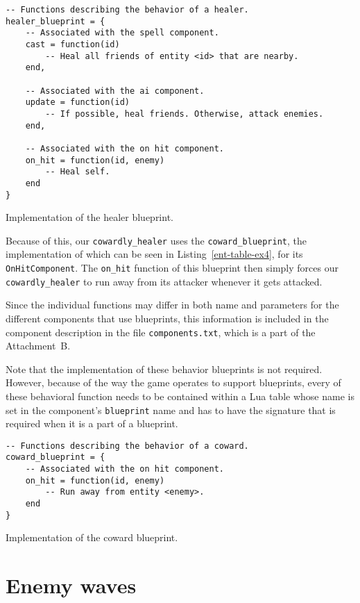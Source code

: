 \begin{listing}[H]
    \centering
    \begin{lstlisting}
-- Functions describing the behavior of a healer.
healer_blueprint = {
    -- Associated with the spell component.
    cast = function(id)
        -- Heal all friends of entity <id> that are nearby.
    end,

    -- Associated with the ai component.
    update = function(id)
        -- If possible, heal friends. Otherwise, attack enemies.
    end,

    -- Associated with the on hit component.
    on_hit = function(id, enemy)
        -- Heal self.
    end
}
    \end{lstlisting}
    \caption{Implementation of the healer blueprint.}
    \label{ent-table-ex3}
\end{listing}

Because of this, our \texttt{cowardly\_healer} uses the \texttt{coward\_blueprint}, the implementation of which can be seen in
Listing~\ref{ent-table-ex4}, for its \texttt{OnHitComponent}. The \texttt{on\_hit} function of this blueprint then simply forces our
\texttt{cowardly\_healer} to run away from its attacker whenever it gets attacked.

Since the individual functions may differ in both name and parameters for the different components that use blueprints, this information
is included in the component description in the file \texttt{components.txt}, which is a part of the Attachment~B.

Note that the implementation of these behavior blueprints is not required. However, because of the way the game operates to support
blueprints, every of these behavioral function needs to be contained within a Lua table whose name is set in the component's
\texttt{blueprint} name and has to have the signature that is required when it is a part of a blueprint.

\begin{listing}[H]
    \centering
    \begin{lstlisting}
-- Functions describing the behavior of a coward.
coward_blueprint = {
    -- Associated with the on hit component.
    on_hit = function(id, enemy)
        -- Run away from entity <enemy>.
    end
}
    \end{lstlisting}
    \caption{Implementation of the coward blueprint.}
    \label{ent-table-ex4}
\end{listing}

\section{Enemy waves}

